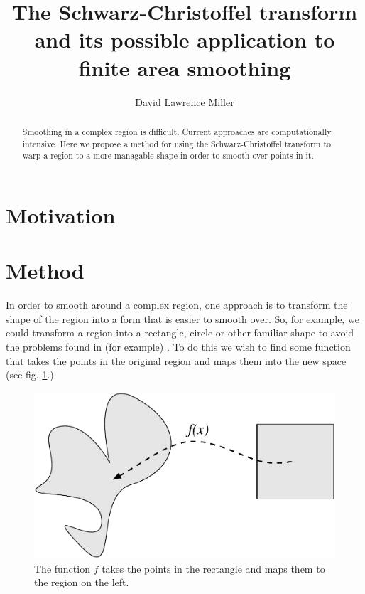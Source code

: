 \documentclass[a4paper,10pt]{amsart}
\title{The Schwarz-Christoffel transform and its possible application to finite area smoothing}
\author{David Lawrence Miller}
\newcommand{\sch}{Schwarz-Christoffel }
\begin{document}
 
\begin{abstract}
Smoothing in a complex region is difficult. Current approaches are computationally intensive. Here we propose a method for using the \sch transform to warp a region to a more managable shape in order to smooth over points in it.
\end{abstract}
 
 
\newtheorem{thm}{Theorem}[section]
 
\newtheorem{defn}{Definition}[section]
 
\maketitle



\section{Motivation}



\section{Method}

In order to smooth around a complex region, one approach is to transform the shape of the region into a form that is easier to smooth over. So, for example, we could transform a region into a rectangle, circle or other familiar shape to avoid the problems found in (for example) \cite{ramsay}. To do this we wish to find some function that takes the points in the original region and maps them into the new space (see fig. \ref{simpledia}.)

\begin{figure} [htbp]
\centering
\includegraphics[scale=0.3]{figs/simpledia.pdf}
\caption{The function $f$ takes the points in the rectangle and maps them to the region on the left.}
\label{simpledia}
\end{figure}
\end{document}
